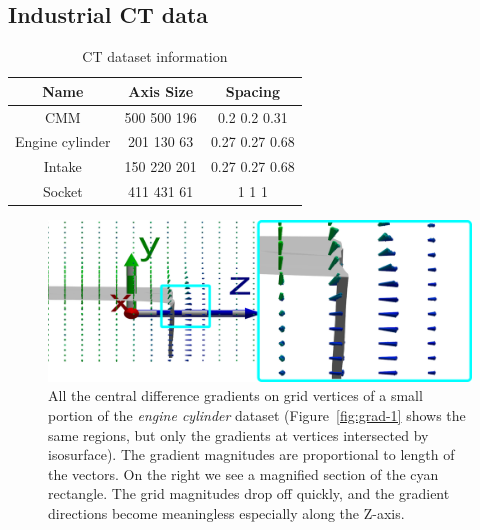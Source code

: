 \subsection{Industrial CT data} 
\begin{table}[hb]
	\centering
	\begin{tabular}{|c c c |} 
		\hline
		Name & Axis Size & Spacing  \\ [0.5ex] 
		\hline
        CMM & 500 500 196 & 0.2 0.2 0.31\\
		Engine cylinder & 201 130 63 & 0.27 0.27 0.68 \\
        Intake &  150 220 201 & 0.27 0.27 0.68 \\
        Socket & 411 431 61 & 1 1 1 \\
		\hline
	\end{tabular}
	\caption{CT dataset information}
	\label{table:ictDataInfo}
\end{table}
\begin{figure}[htb]
    \centering
    \includegraphics[width=\linewidth]{images/cdiff.all.new.eps}
    \caption{All the central difference gradients on  grid vertices of a small portion of the \textit{engine cylinder} dataset
	(Figure~\ref{fig:grad-1} shows the same regions, 
	but only the gradients at vertices intersected by isosurface).
	The gradient magnitudes are proportional to length of the vectors.
	On the right we see a magnified section of the cyan rectangle.
    The grid magnitudes drop off quickly, and the gradient directions become meaningless especially along the Z-axis. 
    }
    \label{fig:setA.crop1.cdiff}
\end{figure}
